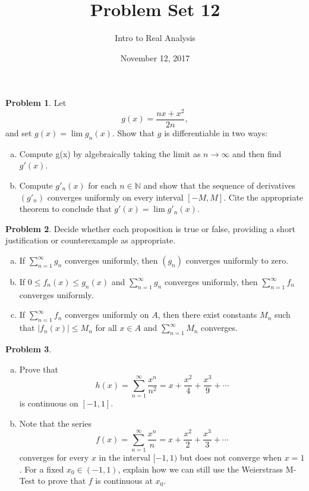\documentclass{amsart}
\newcommand{\+}[1]{\ensuremath{\mathbf{#1}}}
\theoremstyle{definition}
\newtheorem{prob}{Problem}
\begin{document}
\title{Problem Set 12}
\date{November 12, 2017}
\author{Intro to Real Analysis}

\maketitle



\begin{prob}
Let 
\[
g(x) = \frac{nx + x^2}{2n},
\]
and set $g(x) = \lim g_n(x)$.  Show that
$g$ is differentiable in two ways:
\begin{enumerate}[(a)]
 \item Compute g(x) by algebraically taking the limit
 as $n \to \infty$ and then find $g'(x)$.
 \item Compute $g'_n(x)$ for each $n \in \mathbb{N}$ and
 show that the sequence of derivatives $(g'_n)$
 converges uniformly on every interval $[-M,M]$.
 Cite the appropriate theorem to conclude
 that $g'(x) = \lim g'_n(x)$.
\end{enumerate}
\end{prob}

\begin{prob}
Decide whether each proposition is true or false, providing
a short justification or counterexample as appropriate.
\begin{enumerate}[(a)]
 \item If $\sum^{\infty}_{n=1} g_n$ converges
 uniformly, then $(g_n)$ converges uniformly to zero.
 \item If $0 \leq f_n(x) \leq g_n(x)$ and
 $\sum^{\infty}_{n=1} g_n$ converges uniformly,
 then $\sum^{\infty}_{n=1} f_n$ converges uniformly.
 \item If $\sum^{\infty}_{n=1} f_n$ converges uniformly
 on $A$, then there exist constants $M_n$ such that
 $|f_n(x)| \leq M_n$ for all $x \in A$
 and $\sum^{\infty}_{n=1} M_n$ converges.
\end{enumerate}

\end{prob}

\begin{prob}
 \begin{enumerate}[(a)]
  \item Prove that 
  \[
 h(x) = \sum^{\infty}_{n=1}\frac{x^n}{n^2}
 = x + \frac{x^2}{4} + \frac{x^3}{9} + \cdots
 \]
 is continuous on $[-1,1]$.
 \item Note that the series
   \[
 f(x) = \sum^{\infty}_{n=1}\frac{x^n}{n}
 = x + \frac{x^2}{2} + \frac{x^3}{3} + \cdots
 \]
 converges for every $x$ in the interval $[-1,1)$ but
 does not converge when $x = 1$.  For a fixed
 $x_0 \in (-1,1)$, explain how we can still use the 
 Weierstrass M-Test to prove that $f$
 is continuous at $x_0$.
 \end{enumerate}

\end{prob}
\end{document}
